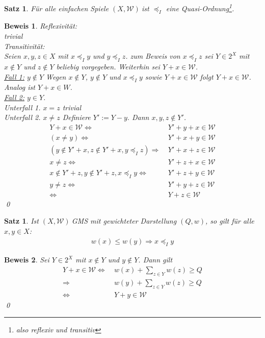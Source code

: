 \documentclass[ngerman]{scrartcl}
\theoremstyle{custom}
\newtheorem{ms}[mdef]{Satz}
\newtheorem*{bw}{Beweis}
\newcommand{\0}{\mathbf{0}}
\newcommand{\1}{\mathbf{L}}
\newcommand{\sg}{$(X,\mathcal{W})~$}
\newcommand{\W}{\mathcal{W}}
\newcommand{\ww}{\preccurlyeq _{I}}
\begin{document}
\begin{ms}
F\"ur alle einfachen Spiele \sg ist $\ww$ eine
Quasi-Ordnung\footnote{also reflexiv und transitiv}.
\end{ms}

\begin{bw}
Reflexivit\"at:\\
trivial\\

Transitivit\"at:\\
Seien $x,y,z \in X$ mit $x \ww y$ und $y \ww z$. zum Beweis von $x \ww
z$ sei $Y \in 2^X$ mit $x \not \in Y$ und $z \not \in Y$ beliebig
vorgegeben. Weiterhin sei $Y+x \in \W$.\\
\underline{Fall 1:} $y \not \in Y$ Wegen $x \not \in Y$, $y \not
\in Y$ und $x \ww y$ sowie $Y+x \in \W$ folgt $Y+x \in \W$. Analog ist
$Y+x \in W$.\\
\underline{Fall 2:} $y \in Y$.\\
Unterfall 1. $x=z$ trivial\\
Unterfall 2. $x \not = z$ Definiere $Y' := Y-y.$ Dann $x,y,z
  \not \in Y'$.
\begin{align*}
Y+x \in \W \Leftrightarrow &~ Y'+y+x \in \W\\
(x \not = y) \Leftrightarrow &~ Y'+x+y \in \W\\
(y \not \in Y'+x, z \not \in Y'+x, y \ww z) \Rightarrow &~ Y'+x+z \in
\W\\
x \not = z \Leftrightarrow &~ Y'+z+x \in \W\\
x \not \in Y'+z, y \not \in Y'+z, x \ww y \Leftrightarrow &~ Y'+z+y
\in \W\\
y \not = z \Leftrightarrow &~ Y'+y+z \in \W\\
\Leftrightarrow &~ Y+z \in \W
\end{align*}
\qed
\end{bw}

\begin{ms}
Ist \sg GMS mit gewichteter Darstellung $(Q,w)$, so gilt f\"ur alle
$x,y \in X$:
\begin{align*}
w(x) \leq w(y) \Rightarrow x \ww y
\end{align*}
\end{ms}

\begin{bw}
Sei $Y \in 2^X$ mit $x \not \in Y$ und $y \not \in Y$. Dann gilt
\begin{align*}
Y+x \in \W \Leftrightarrow &~ w(x) + \sum_{z \in Y} w(z) \geq Q\\
\Rightarrow &~ w(y) + \sum_{z \in Y} w(z) \geq Q\\
\Leftrightarrow &~ Y+y \in \W
\end{align*}
\qed
\end{bw}
\end{document}
